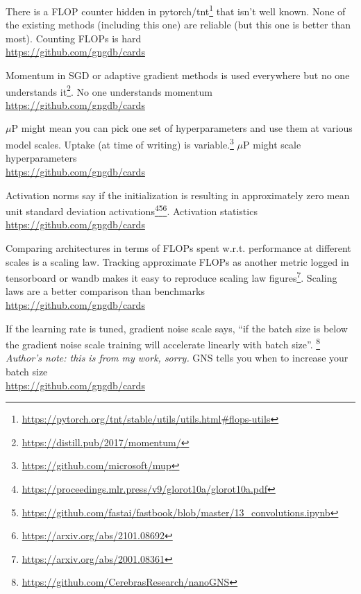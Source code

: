 \documentclass[grid,avery5371]{flashcards}
\newcommand{\cb}[1]{#1 \\ {\small \url{https://github.com/gngdb/cards}}}
\begin{document}
\begin{flashcard}[???]{%
There is a FLOP counter hidden in 
pytorch/tnt\footnote{\small \url{https://pytorch.org/tnt/stable/utils/utils.html\#flops-utils}}
that isn't well known.
None of the existing methods (including this one) are reliable (but this one
is better than most).
}
\cb{Counting FLOPs is hard}
\end{flashcard}

\begin{flashcard}[distill]{%
Momentum in SGD or adaptive gradient methods is used everywhere but no
one understands it\footnote{\small \url{https://distill.pub/2017/momentum/}}.
}
\cb{No one understands momentum}
\end{flashcard}

\begin{flashcard}[???]{%
$\mu$P might mean you can pick one set of hyperparameters and use them
at various model scales. Uptake (at time of writing) is 
variable.\footnote{\small \url{https://github.com/microsoft/mup}}
}
\cb{$\mu$P might scale hyperparameters}
\end{flashcard}

\begin{flashcard}[xavier]{%
Activation norms say if the initialization is resulting
in approximately zero mean unit standard 
deviation activations\footnote{\small \url{https://proceedings.mlr.press/v9/glorot10a/glorot10a.pdf}}\footnote{\small \sloppy \url{https://github.com/fastai/fastbook/blob/master/13_convolutions.ipynb}}\footnote{\small \url{https://arxiv.org/abs/2101.08692}}.
}
\cb{Activation statistics}
\end{flashcard}

\begin{flashcard}[joel]{%
Comparing architectures in terms of FLOPs spent w.r.t. performance
at different scales is a scaling law. Tracking approximate FLOPs
as another metric logged in tensorboard or wandb makes it easy to reproduce
scaling law figures\footnote{\small \url{https://arxiv.org/abs/2001.08361}}.
}
\cb{Scaling laws are a better comparison than benchmarks}
\end{flashcard}


\begin{flashcard}[???]{%
If the learning rate is tuned, gradient noise scale says, ``if the batch 
size is below the gradient noise scale training will accelerate linearly
with batch size''.
\footnote{\small \url{https://github.com/CerebrasResearch/nanoGNS}}
\emph{Author's note: this is from my work, sorry.}
}
\cb{GNS tells you when to increase your batch size}
\end{flashcard}
\end{document}
